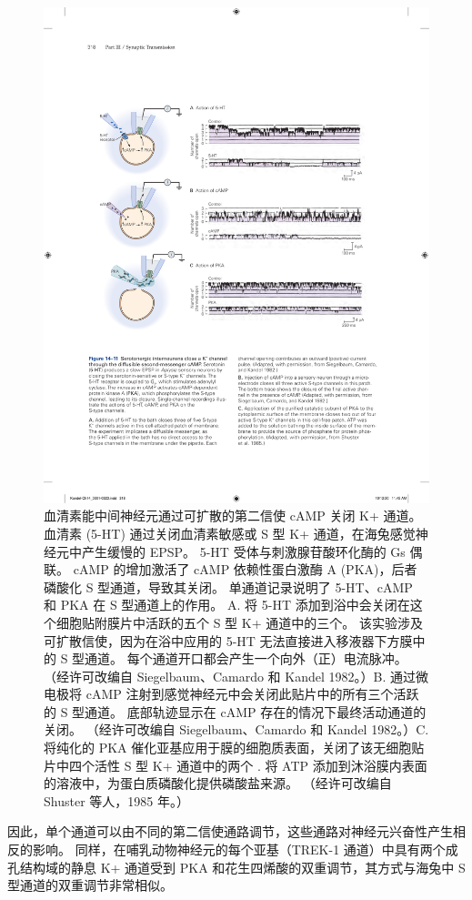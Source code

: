 \begin{figure}[htbp]
	\centering
	\includegraphics[width=0.85\linewidth]{chap14/fig_14_11}
	\caption{血清素能中间神经元通过可扩散的第二信使 cAMP 关闭 K+ 通道。 血清素 (5-HT) 通过关闭血清素敏感或 S 型 K+ 通道，在海兔感觉神经元中产生缓慢的 EPSP。 5-HT 受体与刺激腺苷酸环化酶的 Gs 偶联。 cAMP 的增加激活了 cAMP 依赖性蛋白激酶 A (PKA)，后者磷酸化 S 型通道，导致其关闭。 单通道记录说明了 5-HT、cAMP 和 PKA 在 S 型通道上的作用。 A. 将 5-HT 添加到浴中会关闭在这个细胞贴附膜片中活跃的五个 S 型 K+ 通道中的三个。 该实验涉及可扩散信使，因为在浴中应用的 5-HT 无法直接进入移液器下方膜中的 S 型通道。 每个通道开口都会产生一个向外（正）电流脉冲。 （经许可改编自 Siegelbaum、Camardo 和 Kandel 1982。）B. 通过微电极将 cAMP 注射到感觉神经元中会关闭此贴片中的所有三个活跃的 S 型通道。 底部轨迹显示在 cAMP 存在的情况下最终活动通道的关闭。 （经许可改编自 Siegelbaum、Camardo 和 Kandel 1982。）C. 将纯化的 PKA 催化亚基应用于膜的细胞质表面，关闭了该无细胞贴片中四个活性 S 型 K+ 通道中的两个 . 将 ATP 添加到沐浴膜内表面的溶液中，为蛋白质磷酸化提供磷酸盐来源。 （经许可改编自 Shuster 等人，1985 年。）}
	\label{fig:14_11}
\end{figure}


因此，单个通道可以由不同的第二信使通路调节，这些通路对神经元兴奋性产生相反的影响。 
同样，在哺乳动物神经元的每个亚基（TREK-1 通道）中具有两个成孔结构域的静息 K+ 通道受到 PKA 和花生四烯酸的双重调节，其方式与海兔中 S 型通道的双重调节非常相似。


